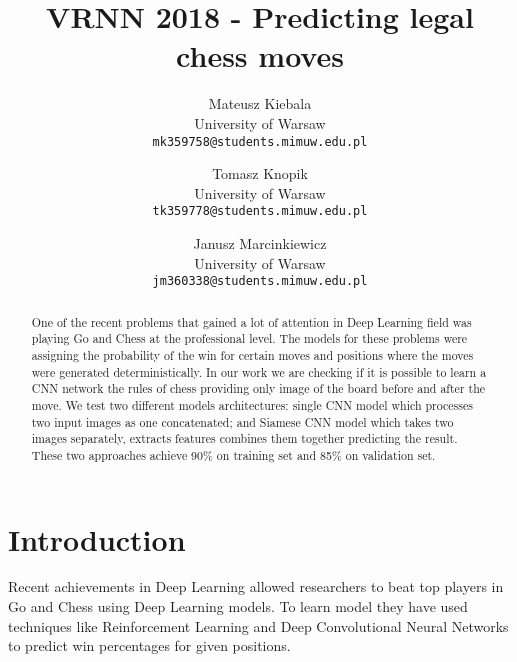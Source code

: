 \documentclass[10pt,twocolumn,letterpaper]{article}
\begin{document}
\title{VRNN 2018 - Predicting legal chess moves}

\author{Mateusz Kiebala\\
University of Warsaw\\
{\tt\small mk359758@students.mimuw.edu.pl}
\and
Tomasz Knopik\\
University of Warsaw\\
{\tt\small tk359778@students.mimuw.edu.pl}
\and
Janusz Marcinkiewicz\\
University of Warsaw\\
{\tt\small jm360338@students.mimuw.edu.pl}}

\maketitle

\begin{abstract}
   One of the recent problems that gained a lot of attention in Deep Learning
   field was playing Go and Chess at the professional level. The models for these
   problems were assigning the probability of the win for certain moves and
   positions where the moves were generated deterministically. In our work we are
   checking if it is possible to learn a CNN network the rules of chess
   providing only image of the board before and after the move. We test two
   different models architectures: single CNN model which processes two input
   images as one concatenated; and Siamese CNN model which takes two images
   separately, extracts features combines them together predicting the result.
   These two approaches achieve 90\% on training set and 85\% on validation set.
\end{abstract}

\section{Introduction}

Recent achievements in Deep Learning allowed researchers to beat top players in
Go and Chess using Deep Learning models. To learn model they have used
techniques like Reinforcement Learning and Deep Convolutional Neural Networks to
predict win percentages for given positions.
\end{document}
